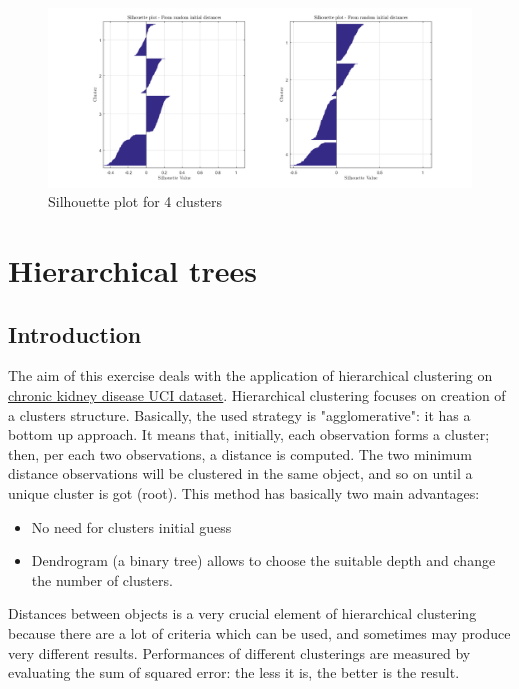 \documentclass{article}
\begin{document}
\begin{figure}[H]
	\centering
	\includegraphics[width=1\textwidth]{pictures/silhouette4cl.png}
	\caption{Silhouette plot for 4 clusters}\label{fig:silhouette4cl}
\end{figure}

\newpage
\section{Hierarchical trees}
\subsection{Introduction}
The aim of this exercise deals with the application of hierarchical clustering on \href{https://archive.ics.uci.edu/ml/datasets/Chronic_Kidney_Disease}{chronic kidney disease UCI dataset}. Hierarchical clustering focuses on creation of a clusters structure. Basically, the used strategy is "agglomerative": it has a bottom up approach. It means that, initially, each observation forms a cluster; then, per each two observations, a distance is computed. The two minimum distance observations will be clustered in the same object, and so on until a unique cluster is got (root). This method has basically two main advantages: 
\begin{itemize}
	\item No need for clusters initial guess
	\item Dendrogram (a binary tree) allows to choose the suitable depth and change the number of clusters.
\end{itemize}

Distances between objects is a very crucial element of hierarchical clustering because there are a lot of criteria which can be used, and sometimes may produce very different results. Performances of different clusterings are measured by evaluating the sum of squared error: the less it is, the better is the result.\\
\end{document}
